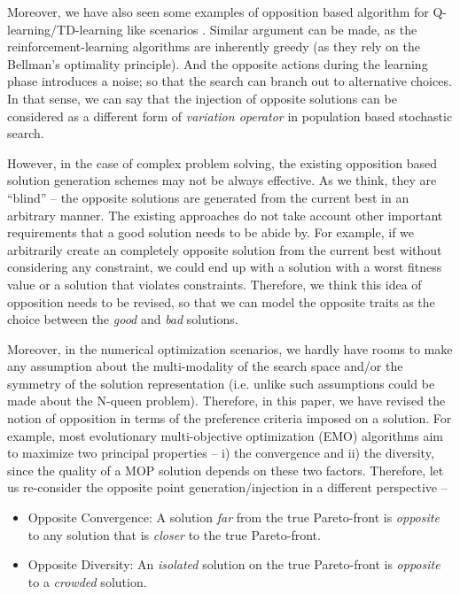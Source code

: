 \documentclass[journal]{IEEEtran}
\begin{document}
Moreover, we have also seen some examples of opposition based algorithm for Q-learning/TD-learning like scenarios \cite{obl-rl}. Similar argument can be made, as the reinforcement-learning algorithms are inherently greedy (as they rely on the Bellman's optimality principle). And the opposite actions during the learning phase introduces a noise; so that the search can branch out to alternative choices. In that sense, we can say that the injection of opposite solutions can be considered as a different form of \textit{variation operator} in population based stochastic search. 

However, in the case of complex problem solving, the existing opposition based solution generation schemes may not be always effective. As we think, they are ``blind'' -- the opposite solutions are generated from the current best in an arbitrary manner. The existing approaches do not take account other important requirements that a good solution needs to be abide by. For example, if we arbitrarily create an completely opposite solution from the current best without considering any constraint, we could end up with a solution with a worst fitness value or a solution that violates constraints. Therefore, we think this idea of opposition needs to be revised, so that we can model the opposite traits as the choice between the \textit{good} and \textit{bad} solutions.

Moreover, in the numerical optimization scenarios, we hardly have rooms to make any assumption about the multi-modality of the search space and/or the symmetry of the solution representation (i.e. unlike such assumptions could be made about the N-queen problem). Therefore, in this paper, we have revised the notion of opposition in terms of the preference criteria imposed on a solution. For example, most evolutionary multi-objective optimization (EMO) algorithms aim to maximize two principal properties -- i) the convergence and ii) the diversity, since the quality of a MOP solution depends on these two factors. Therefore, let us re-consider the opposite point generation/injection in a different perspective --
\begin{itemize}
	\item Opposite Convergence: A solution \textit{far} from the true Pareto-front is \textit{opposite} to any solution that is \textit{closer} to the true Pareto-front.
	\item Opposite Diversity: An \textit{isolated} solution on the true Pareto-front is \textit{opposite} to a \textit{crowded} solution. 
\end{itemize}
\end{document}
